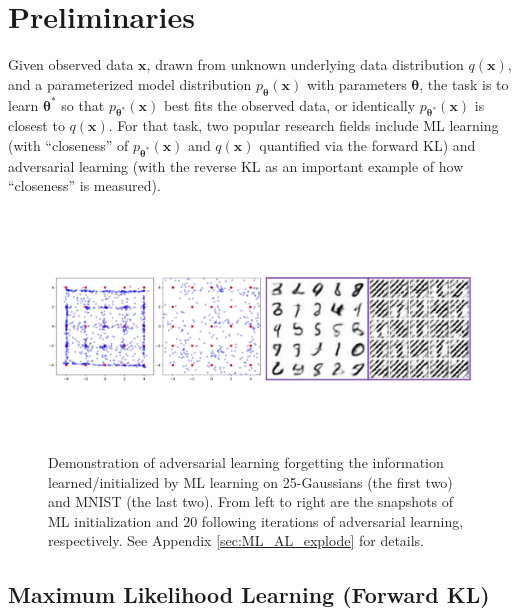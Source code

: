 \documentclass[letterpaper]{article} %
\newcommand{\xv}[0]{\ensuremath{\boldsymbol{x}} }
\newcommand{\thetav}[0]{\ensuremath{\boldsymbol{\theta}} }
\begin{document}
\section{Preliminaries}
\label{sec:Preliminary}




Given observed data $\xv$, drawn from unknown underlying data distribution $q(\xv)$, and a parameterized model distribution $p_{\thetav}(\xv)$ with parameters $\thetav$, the task is to learn $\thetav^{*}$ so that $p_{\thetav^{*}}(\xv)$ best fits the observed data, or identically $p_{\thetav^{*}}(\xv)$ is closest to $q(\xv)$.
For that task, two popular research fields include ML learning (with ``closeness'' of $p_{\thetav^{*}}(\xv)$ and $q(\xv)$ quantified via the forward KL) and adversarial learning (with the reverse KL as an important example of how ``closeness'' is measured).



\begin{figure}[tb]
	\centering
		\includegraphics[height=0.23 \columnwidth]{Figures/25GS_MNIST_SN_Forgetting.pdf}
		\caption{
			Demonstration of adversarial learning forgetting the information learned/initialized by ML learning on 25-Gaussians (the first two) and MNIST (the last two). From left to right are the snapshots of ML initialization and $20$ following iterations of adversarial learning, respectively. See
			Appendix \ref{sec:ML_AL_explode}
			for details.
		}
		\label{fig:explodes}
\end{figure}


\subsection{Maximum Likelihood Learning (Forward KL)}
\end{document}
